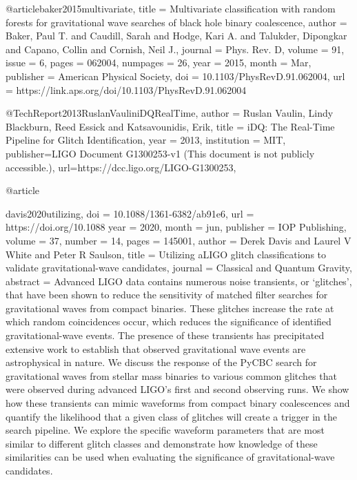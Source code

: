 {{@article{baker2015multivariate,
  title = {Multivariate classification with random forests for gravitational wave searches of black hole binary coalescence},
  author = {Baker, Paul T. and Caudill, Sarah and Hodge, Kari A. and Talukder, Dipongkar and Capano, Collin and Cornish, Neil J.},
  journal = {Phys. Rev. D},
  volume = {91},
  issue = {6},
  pages = {062004},
  numpages = {26},
  year = {2015},
  month = {Mar},
  publisher = {American Physical Society},
  doi = {10.1103/PhysRevD.91.062004},
  url = {https://link.aps.org/doi/10.1103/PhysRevD.91.062004}
}


@TechReport{2013RuslanVauliniDQRealTime,
  author = {Ruslan Vaulin, Lindy Blackburn, Reed Essick and Katsavounidis, Erik},
  title  = {iDQ: The Real-Time Pipeline for Glitch Identification},
  year   = {2013},
  institution = {MIT},
  publisher={LIGO Document G1300253-v1 (This document is not publicly accessible.)},
  url={https://dcc.ligo.org/LIGO-G1300253},
}


@article{davis2020utilizing,
	doi = {10.1088/1361-6382/ab91e6},
	url = {https://doi.org/10.1088%
	year = 2020,
	month = {jun},
	publisher = {{IOP} Publishing},
	volume = {37},
	number = {14},
	pages = {145001},
	author = {Derek Davis and Laurel V White and Peter R Saulson},
	title = {Utilizing {aLIGO} glitch classifications to validate gravitational-wave candidates},
	journal = {Classical and Quantum Gravity},
	abstract = {Advanced LIGO data contains numerous noise transients, or ‘glitches’, that have been shown to reduce the sensitivity of matched filter searches for gravitational waves from compact binaries. These glitches increase the rate at which random coincidences occur, which reduces the significance of identified gravitational-wave events. The presence of these transients has precipitated extensive work to establish that observed gravitational wave events are astrophysical in nature. We discuss the response of the PyCBC search for gravitational waves from stellar mass binaries to various common glitches that were observed during advanced LIGO’s first and second observing runs. We show how these transients can mimic waveforms from compact binary coalescences and quantify the likelihood that a given class of glitches will create a trigger in the search pipeline. We explore the specific waveform parameters that are most similar to different glitch classes and demonstrate how knowledge of these similarities can be used when evaluating the significance of gravitational-wave candidates.}
}


}}}
